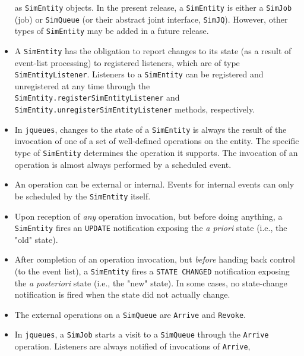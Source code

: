 \documentclass[12pt]{book}
\begin{document}
\begin{itemize}
          as \lstinline|SimEntity| objects.
        In the present release,
          a \lstinline|SimEntity| is either a \lstinline|SimJob|
          (job) or \lstinline|SimQueue| (or their abstract joint interface,
          \lstinline|SimJQ|).
        However, other types of \lstinline|SimEntity| may be added in a future release.
  \item A \lstinline|SimEntity| has the obligation to report
          changes to its state (as a result of event-list processing)
          to registered listeners,
          which are of type \lstinline|SimEntityListener|.
        Listeners to a \lstinline|SimEntity| can be registered and
          unregistered at any time through the
          \lstinline|SimEntity.registerSimEntityListener|
          and \lstinline|SimEntity.unregisterSimEntityListener|
          methods, respectively.
  \item In \lstinline|jqueues|, changes to the state
          of a \lstinline|SimEntity| is always the result
          of the invocation of one of a set of well-defined
          operations on the entity.
        The specific type of \lstinline|SimEntity|
          determines the operation it supports.
        The invocation of an operation is
          almost always performed by a scheduled event.
  \item An operation can be external or internal.
        Events for internal events can only be scheduled
          by the \lstinline|SimEntity| itself.
  \item Upon reception of {\em any\/} operation invocation,
          but before doing anything,
          a \lstinline|SimEntity| fires an \lstinline|UPDATE|
          notification exposing the {\em a priori\/} state
          (i.e., the "old" state).
  \item After completion of an operation invocation,
          but {\em before\/} handing back control (to the event list),
          a \lstinline|SimEntity| fires a \lstinline|STATE CHANGED|
          notification exposing the {\em a posteriori\/} state
          (i.e., the "new" state).
          In some cases, no state-change notification is fired when
            the state did not actually change.
  \item The external operations on a \lstinline|SimQueue| are
          \lstinline|Arrive| and \lstinline|Revoke|.
  \item In \lstinline|jqueues|,
          a \lstinline|SimJob| starts a visit to a \lstinline|SimQueue|
          through the \lstinline|Arrive| operation.
        Listeners are always notified of invocations of \lstinline|Arrive|,

\end{itemize}
\end{document}
